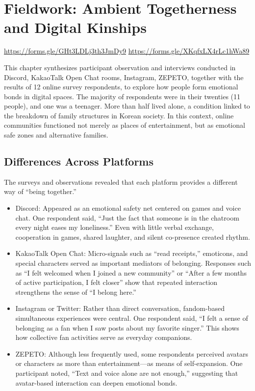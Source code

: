 \chapter{Fieldwork: Ambient Togetherness and Digital Kinships}

\href{Korean Survey}{https://forms.gle/GHt3LDLj3th3JmDy9}
\href{English Survey}{https://forms.gle/XKqfxLX4rLc1hWa89}

This chapter synthesizes participant observation and interviews conducted in Discord, KakaoTalk Open Chat rooms, Instagram, ZEPETO, together with the results of 12 online survey respondents, to explore how people form emotional bonds in digital spaces. The majority of respondents were in their twenties (11 people), and one was a teenager. More than half lived alone, a condition linked to the breakdown of family structures in Korean society. In this context, online communities functioned not merely as places of entertainment, but as emotional safe zones and alternative families.  


\section{Differences Across Platforms}
The surveys and observations revealed that each platform provides a different way of “being together.”  

\begin{itemize}
    \item Discord: Appeared as an emotional safety net centered on games and voice chat. One respondent said, “Just the fact that someone is in the chatroom every night eases my loneliness.” Even with little verbal exchange, cooperation in games, shared laughter, and silent co-presence created rhythm.
    \item KakaoTalk Open Chat: Micro-signals such as “read receipts,” emoticons, and special characters served as important mediators of belonging. Responses such as “I felt welcomed when I joined a new community” or “After a few months of active participation, I felt closer” show that repeated interaction strengthens the sense of “I belong here.”
    \item Instagram or Twitter: Rather than direct conversation, fandom-based simultaneous experiences were central. One respondent said, “I felt a sense of belonging as a fan when I saw posts about my favorite singer.” This shows how collective fan activities serve as everyday companions.
    \item ZEPETO: Although less frequently used, some respondents perceived avatars or characters as more than entertainment—as means of self-expansion. One participant noted, “Text and voice alone are not enough,” suggesting that avatar-based interaction can deepen emotional bonds.
\end{itemize}


